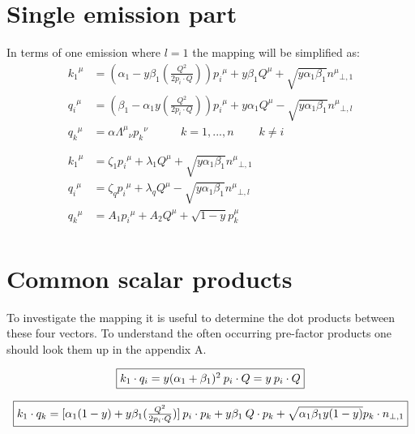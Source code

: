 \section{Single emission part}
In terms of one emission where $ l=1 $ the mapping will be simplified as:
\begin{equation}
	\begin{aligned}
	{k_1}^{\mu} &= (\alpha_1 -y\beta_1(\frac{Q^2}{2p_i \cdot Q})) {p_i}^{\mu} + y\beta_1{Q}^{\mu} + \sqrt{y\alpha_1\beta_1}{n^{\mu}}_{\bot,1}  \\
	{q_i}^{\mu}   &= (\beta_1 -\alpha_1 y(\frac{Q^2}{2p_i \cdot Q})){p_i}^{\mu} + y\alpha_1{Q}^{\mu} - \sqrt{y\alpha_1\beta_1}{n^{\mu}}_{\bot,l} \\
	{q_k}^{\mu} &= \alpha {\Lambda^{\mu}}_{\nu}{p_k}^{\nu} \:\:\:\:\:\:\:\:\:\:\:\:\: {k=1,...,n}\:\:\:\:\:\:\:\:\:\:k\neq i\\
	\\
	\\
		{k_1}^{\mu} &= \zeta_1 {p_i}^{\mu} + \lambda_1{Q}^{\mu} + \sqrt{y\alpha_1\beta_1}{n^{\mu}}_{\bot,1}  \\
	{q_i}^{\mu}   &= \zeta_q{p_i}^{\mu} + \lambda_q{Q}^{\mu} - \sqrt{y\alpha_1\beta_1}{n^{\mu}}_{\bot,l} \\
	{q_k}^{\mu} &= A_1{p_i}^{\mu} + A_2{Q}^{\mu} + \sqrt{1-y}{p_k^{\mu}}\\
    \end{aligned}
\end{equation}


\section{Common scalar products}
To investigate the mapping it is useful to determine the dot products between these four vectors. To understand the often occurring pre-factor products one should look them up in the appendix A.

\begin{equation}
	\begin{aligned}
		\fbox{$  k_1 \cdot q_i=y({\alpha_1}+\beta_1)^2\:p_i\cdot Q = y\:p_i\cdot Q $}
    \end{aligned}
\end{equation}

\begin{equation}
	\begin{aligned}
		\fbox{$  k_1 \cdot q_k = [\alpha_1 (1-y)+y\beta_1(\frac{Q^2}{2p_i \cdot Q})]\:p_i \cdot p_k+y\beta_1\:Q\cdot p_k+\sqrt{\alpha_1\beta_1y(1-y)} p_k \cdot {n_{\bot,1}} $}
    \end{aligned}
\end{equation}

